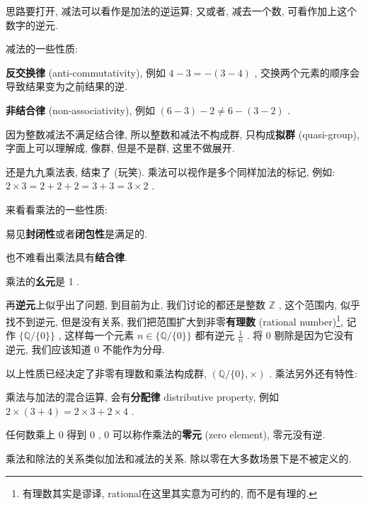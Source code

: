 \begin{tcolorbox}[size=fbox, breakable, enhanced jigsaw, title={减法 (subtraction)}]

思路要打开, 减法可以看作是加法的逆运算; 又或者, 减去一个数,
可看作加上这个数字的逆元.

减法的一些性质:

\begin{itemize}
{\item
  \textbf{反交换律} (anti-commutativity), 例如 $4−3=−(3−4)$ ,
  交换两个元素的顺序会导致结果变为之前结果的逆.}
{\item
  \textbf{非结合律} (non-associativity), 例如 $(6−3)−2\neq 6−(3−2)$ .}
\end{itemize}

因为整数减法不满足结合律, 所以整数和减法不构成群, 只构成\textbf{拟群}
(quasi-group), 字面上可以理解成, 像群, 但是不是群, 这里不做展开.

\end{tcolorbox}

\begin{tcolorbox}[size=fbox, breakable, enhanced jigsaw, title={乘法(multiplication)}]

还是九九乘法表, 结束了 (玩笑). 乘法可以视作是多个同样加法的标记, 例如:
$2×3=2+2+2=3+3=3×2$ .

来看看乘法的一些性质:

\begin{itemize}
{\item
  易见\textbf{封闭性}或者\textbf{闭包性}是满足的.}
{\item
  也不难看出乘法具有\textbf{结合律}.}
{\item
  乘法的\textbf{幺元}是 1 .}
{\item
  再\textbf{逆元}上似乎出了问题, 到目前为止, 我们讨论的都还是整数
  $\mathbb{Z}$ , 这个范围内, 似乎找不到逆元, 但是没有关系,
  我们把范围扩大到非零\textbf{有理数} (rational number)\footnote{有理数其实是谬译,
    rational在这里其实意为可约的, 而不是有理的.}, 记作
  $\{\mathbb{Q}/\{0\}\}$ , 这样每一个元素 $n\in\{\mathbb{Q}/\{0\}\}$
  都有逆元 $\frac{1}{n}$ . 将 $0$ 剔除是因为它没有逆元, 我们应该知道
  0 不能作为分母.}
\end{itemize}

以上性质已经决定了非零有理数和乘法构成群, $(\mathbb{Q}/\{0\},×)$ .
乘法另外还有特性:

\begin{itemize}
{\item
  乘法与加法的混合运算, 会有\textbf{分配律} distributive property, 例如
  $2×(3+4)=2×3+2×4$ .}
{\item
  任何数乘上 $0$ 得到 $0$ , $0$ 可以称作乘法的\textbf{零元} (zero
  element), 零元没有逆.}
\end{itemize}

\end{tcolorbox}

\begin{tcolorbox}[size=fbox, breakable, enhanced jigsaw, title={除法 (division)}]

乘法和除法的关系类似加法和减法的关系. 除以零在大多数场景下是不被定义的.

\end{tcolorbox}